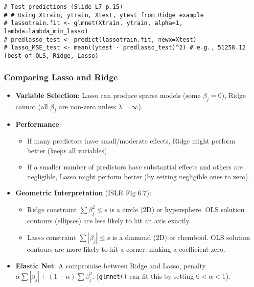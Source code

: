 \documentclass[12pt,a4paper]{article}
\newcommand{\Rfunction}[1]{\texttt{#1()}} %
\begin{document}
\begin{itemize}
\begin{itemize}
\begin{itemize}
\begin{itemize}
\begin{lstlisting}[caption={Lasso Example (Simulated Data, Slides L7 p.14-15)}]
# Test predictions (Slide L7 p.15)
# # Using Xtrain, ytrain, Xtest, ytest from Ridge example
# lassotrain.fit <- glmnet(Xtrain, ytrain, alpha=1, lambda=lambda_min_lasso)
# predlasso_test <- predict(lassotrain.fit, newx=Xtest)
# lasso_MSE_test <- mean((ytest - predlasso_test)^2) # e.g., 51258.12 (best of OLS, Ridge, Lasso)
\end{lstlisting}
                \end{itemize}
        \end{itemize}

    \subsubsection{Comparing Lasso and Ridge }
        \begin{itemize}
            \item \textbf{Variable Selection}: Lasso can produce sparse models (some $\beta_j=0$), Ridge cannot (all $\beta_j$ are non-zero unless $\lambda=\infty$).
            \item \textbf{Performance}:
                \begin{itemize}
                    \item If many predictors have small/moderate effects, Ridge might perform better (keeps all variables).
                    \item If a smaller number of predictors have substantial effects and others are negligible, Lasso might perform better (by setting negligible ones to zero).
                \end{itemize}
            \item \textbf{Geometric Interpretation} (ISLR Fig 6.7):
                \begin{itemize}
                    \item Ridge constraint $\sum \beta_j^2 \le s$ is a circle (2D) or hypersphere. OLS solution contours (ellipses) are less likely to hit an axis exactly.
                    \item Lasso constraint $\sum |\beta_j| \le s$ is a diamond (2D) or rhomboid. OLS solution contours are more likely to hit a corner, making a coefficient zero.
                \end{itemize}
            \item \textbf{Elastic Net}: A compromise between Ridge and Lasso, penalty $\alpha \sum |\beta_j| + (1-\alpha) \sum \beta_j^2$. (\Rfunction{glmnet} can fit this by setting $0 < \alpha < 1$).
        \end{itemize}


\end{itemize}
\end{itemize}
\end{document}
